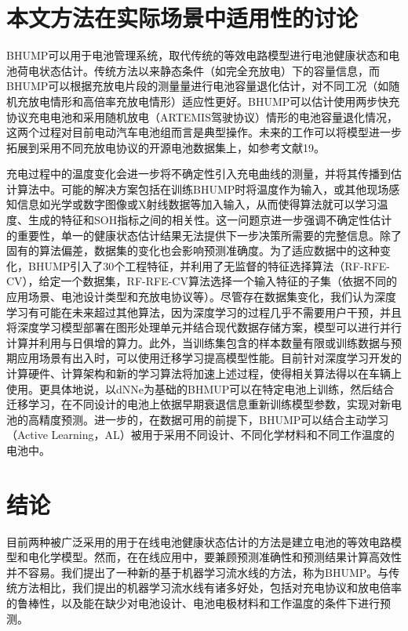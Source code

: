 \documentclass{article}
\begin{document}
\section{本文方法在实际场景中适用性的讨论}

BHUMP可以用于电池管理系统，取代传统的等效电路模型进行电池健康状态和电池荷电状态估计。传统方法以来静态条件（如完全充放电）下的容量信息，而BHUMP可以根据充放电片段的测量量进行电池容量退化估计，对不同工况（如随机充放电情形和高倍率充放电情形）适应性更好。BHUMP可以估计使用两步快充协议充电电池和采用随机放电（ARTEMIS驾驶协议）情形的电池容量退化情况，这两个过程对目前电动汽车电池组而言是典型操作。未来的工作可以将模型进一步拓展到采用不同充放电协议的开源电池数据集上，如参考文献19。

充电过程中的温度变化会进一步将不确定性引入充电曲线的测量，并将其传播到估计算法中。可能的解决方案包括在训练BHUMP时将温度作为输入，或其他现场感知信息如光学或数字图像或X射线数据等加入输入，从而使得算法就可以学习温度、生成的特征和SOH指标之间的相关性。这一问题京进一步强调不确定性估计的重要性，单一的健康状态估计结果无法提供下一步决策所需要的完整信息。除了固有的算法偏差，数据集的变化也会影响预测准确度。为了适应数据中的这种变化，BHUMP引入了30个工程特征，并利用了无监督的特征选择算法（RF-RFE-CV），给定一个数据集，RF-RFE-CV算法选择一个输入特征的子集（依据不同的应用场景、电池设计类型和充放电协议等）。尽管存在数据集变化，我们认为深度学习有可能在未来超过其他算法，因为深度学习的过程几乎不需要用户干预，并且将深度学习模型部署在图形处理单元并结合现代数据存储方案，模型可以进行并行计算并利用与日俱增的算力。此外，当训练集包含的样本数量有限或训练数据与预期应用场景有出入时，可以使用迁移学习提高模型性能。目前针对深度学习开发的计算硬件、计算架构和新的学习算法将加速上述过程，使得相关算法得以在车辆上使用。更具体地说，以dNNe为基础的BHMUP可以在特定电池上训练，然后结合迁移学习，在不同设计的电池上依据早期衰退信息重新训练模型参数，实现对新电池的高精度预测。进一步的，在数据可用的前提下，BHUMP可以结合主动学习（Active Learning，AL）被用于采用不同设计、不同化学材料和不同工作温度的电池中。

\section{结论}

目前两种被广泛采用的用于在线电池健康状态估计的方法是建立电池的等效电路模型和电化学模型。然而，在在线应用中，要兼顾预测准确性和预测结果计算高效性并不容易。我们提出了一种新的基于机器学习流水线的方法，称为BHUMP。与传统方法相比，我们提出的机器学习流水线有诸多好处，包括对充电协议和放电倍率的鲁棒性，以及能在缺少对电池设计、电池电极材料和工作温度的条件下进行预测。
\end{document}
